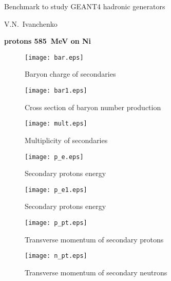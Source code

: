 \documentclass[12pt]{article}
\begin{document}
\pagestyle{empty}

\begin{center}
{\large Benchmark to study GEANT4 hadronic generators} 

\vspace*{5mm}
V.N.~Ivanchenko

\vspace*{5mm}


\vspace*{5mm}

{\bf protons 585~MeV on Ni} 

\vspace*{5mm}


\end{center}


\begin{figure}[htbp]
\caption{Baryon charge of secondaries}
\label{fig1}  
\centerline{\texttt{[image: bar.eps]}}
\end{figure}

\begin{figure}[htbp]
\caption{Cross section of baryon number production}
\label{fig1b}  
\centerline{\texttt{[image: bar1.eps]}}
\end{figure}


\begin{figure}[htbp]
\caption{Multiplicity of secondaries}
\label{fig1a}  
\centerline{\texttt{[image: mult.eps]}}
\end{figure}
\begin{figure}[htbp]
\caption{Secondary protons energy}
\label{fig2} 
\centerline{\texttt{[image: p\_e.eps]}}
\end{figure}
\begin{figure}[htbp]
\caption{Secondary protons energy}
\label{fig2a} 
\centerline{\texttt{[image: p\_e1.eps]}}
\end{figure}

\newpage

\begin{figure}[htbp]
\caption{Transverse momentum of secondary protons} 
\label{fig3}
\centerline{\texttt{[image: p\_pt.eps]}}
\end{figure}

\newpage

\begin{figure}[htbp]
\caption{Transverse momentum of secondary neutrons} 
\label{fig4}
\centerline{\texttt{[image: n\_pt.eps]}}
\end{figure}
\end{document}

